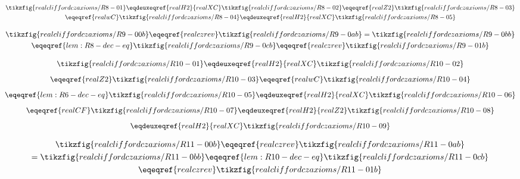\begin{derivation}\label{lem:R8-dec-eq}
  \begin{gather*}
    \tikzfig{realcliffordczaxioms/R8-01}
    \eqdeuxeqref{realH2}{realXC}\tikzfig{realcliffordczaxioms/R8-02}
    \eqeqref{realZ2}\tikzfig{realcliffordczaxioms/R8-03}\\
    \eqeqref{realwC}\tikzfig{realcliffordczaxioms/R8-04}
    \eqdeuxeqref{realH2}{realXC}\tikzfig{realcliffordczaxioms/R8-05}
  \end{gather*}
\end{derivation}

\begin{derivation}\label{lem:R9-dec-eq}
  \begin{gather*}
    \tikzfig{realcliffordczaxioms/R9-00b}
    \eqeqref{realczrev}\tikzfig{realcliffordczaxioms/R9-0ab}
    =\tikzfig{realcliffordczaxioms/R9-0bb}\\
    \eqeqref{lem:R8-dec-eq}\tikzfig{realcliffordczaxioms/R9-0cb}
    \eqeqref{realczrev}\tikzfig{realcliffordczaxioms/R9-01b}
  \end{gather*}
\end{derivation}

\begin{derivation}\label{lem:R10-dec-eq}
  \begin{gather*}
    \tikzfig{realcliffordczaxioms/R10-01}
    \eqdeuxeqref{realH2}{realXC}\tikzfig{realcliffordczaxioms/R10-02}\\[0.2cm]
    \eqeqref{realZ2}\tikzfig{realcliffordczaxioms/R10-03}
    \eqeqref{realwC}\tikzfig{realcliffordczaxioms/R10-04}\\[0.2cm]
    \eqeqref{lem:R6-dec-eq}\tikzfig{realcliffordczaxioms/R10-05}
    \eqdeuxeqref{realH2}{realXC}\tikzfig{realcliffordczaxioms/R10-06}\\[0.2cm]
    \eqeqref{realCF}\tikzfig{realcliffordczaxioms/R10-07}
    \eqdeuxeqref{realH2}{realZ2}\tikzfig{realcliffordczaxioms/R10-08}\\[0.2cm]
    \eqdeuxeqref{realH2}{realXC}\tikzfig{realcliffordczaxioms/R10-09}
  \end{gather*}
\end{derivation}

\begin{derivation}\label{lem:R11-dec-eq}
  \begin{gather*}
    \tikzfig{realcliffordczaxioms/R11-00b}
    \eqeqref{realczrev}\tikzfig{realcliffordczaxioms/R11-0ab}\\
    = \tikzfig{realcliffordczaxioms/R11-0bb}
    \eqeqref{lem:R10-dec-eq}\tikzfig{realcliffordczaxioms/R11-0cb}\\
    \eqeqref{realczrev}\tikzfig{realcliffordczaxioms/R11-01b}
  \end{gather*}
\end{derivation}

